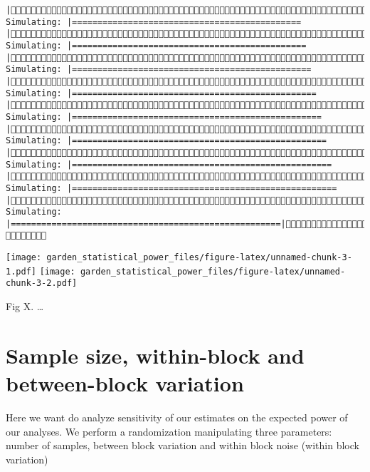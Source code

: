 \documentclass[]{article}
\begin{document}
\begin{verbatim}
|(10/10) Simulating: |=============================================        |(10/10) Simulating: |==============================================       |(10/10) Simulating: |===============================================      |(10/10) Simulating: |================================================     |(10/10) Simulating: |=================================================    |(10/10) Simulating: |==================================================   |(10/10) Simulating: |===================================================  |(10/10) Simulating: |==================================================== |(10/10) Simulating: |=====================================================|(10/10) 
\end{verbatim}

\texttt{[image: garden\_statistical\_power\_files/figure-latex/unnamed-chunk-3-1.pdf]}
\texttt{[image: garden\_statistical\_power\_files/figure-latex/unnamed-chunk-3-2.pdf]}

Fig X. \ldots{}

\section{Sample size, within-block and between-block
variation}\label{sample-size-within-block-and-between-block-variation}

Here we want do analyze sensitivity of our estimates on the expected
power of our analyses. We perform a randomization manipulating three
parameters: number of samples, between block variation and within block
noise (within block variation)
\end{document}
